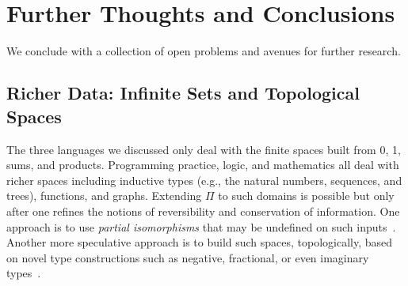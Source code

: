 \documentclass{article}
\begin{document}
\begin{code}
\AgdaSymbol{(}\AgdaSpace{}%
\AgdaSpace{}%
\AgdaSymbol{))}\<%
\\
%
\>[1]\AgdaSpace{}%
\AgdaSpace{}%
\AgdaSpace{}%
\AgdaSpace{}%
\<%
\\
\>[1][@{}l@{\AgdaIndent{0}}]%
\>[2]\AgdaSymbol{((}\AgdaSpace{}%
\AgdaSpace{}%
\AgdaSymbol{)}%
\>[22]\AgdaSpace{}%
\AgdaSymbol{(}\AgdaSpace{}%
\AgdaSpace{}%
\AgdaSymbol{))}\<%
\\
%
\>[1]\AgdaSpace{}%
\AgdaSpace{}%
\<%
\\
\>[1][@{}l@{\AgdaIndent{0}}]%
\>[2]\AgdaSymbol{((}\AgdaSpace{}%
\AgdaSpace{}%
\AgdaSpace{}%
\AgdaSpace{}%
\AgdaSymbol{(}\AgdaSpace{}%
\AgdaSpace{}%
\AgdaSymbol{))}\AgdaSpace{}%
\AgdaSymbol{)}\<%
\end{code}

\section{Further Thoughts and Conclusions}

We conclude with a collection of open problems and avenues for further research.

\subsection{Richer Data: Infinite Sets and Topological Spaces}

The three languages we discussed only deal with the finite spaces
built from 0, 1, sums, and products. Programming practice, logic, and
mathematics all deal with richer spaces including inductive types
(e.g., the natural numbers, sequences, and trees), functions, and
graphs. Extending $\Pi$ to such domains is possible but only after one
refines the notions of reversibility and conservation of
information. One approach is to use \emph{partial isomorphisms} that
may be undefined on such inputs~\cite{infeffects,rc2011}. Another more
speculative approach is to build such spaces, topologically, based on
novel type constructions such as negative, fractional, or even
imaginary types~\cite{seventrees,roshan-thesis}.
\end{document}
